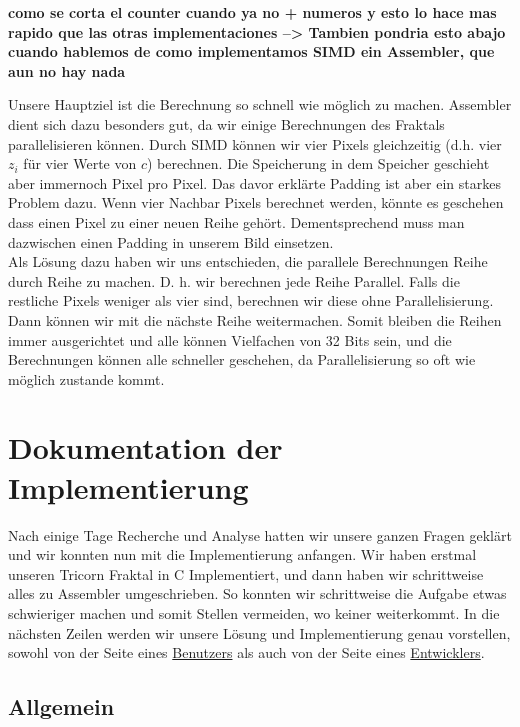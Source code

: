 \documentclass[course=erap]{aspdoc}
\begin{document}
\textbf{como se corta el counter cuando ya no + numeros y esto lo hace mas rapido que las otras implementaciones --> Tambien pondria esto abajo cuando hablemos de como implementamos SIMD ein Assembler, que aun no hay nada}

Unsere Hauptziel ist die Berechnung so schnell wie m\"oglich zu machen. Assembler dient sich dazu besonders gut, da wir einige Berechnungen des Fraktals parallelisieren k\"onnen. Durch SIMD k\"onnen wir vier Pixels gleichzeitig (d.h. vier $z_i$ f\"ur vier Werte von $c$) berechnen. Die Speicherung in dem Speicher geschieht aber immernoch Pixel pro Pixel. Das davor erkl\"arte Padding ist aber ein starkes Problem dazu. Wenn vier Nachbar Pixels berechnet werden, k\"onnte es geschehen dass einen Pixel zu einer neuen Reihe geh\"ort. Dementsprechend muss man dazwischen einen Padding in unserem Bild einsetzen. \\

Als L\"osung dazu haben wir uns entschieden, die parallele Berechnungen Reihe durch Reihe zu machen. D. h. wir berechnen jede Reihe Parallel. Falls die restliche Pixels weniger als vier sind, berechnen wir diese ohne Parallelisierung. Dann k\"onnen wir mit die n\"achste Reihe weitermachen. Somit bleiben die Reihen immer ausgerichtet und alle k\"onnen Vielfachen von 32 Bits sein, und die Berechnungen k\"onnen alle schneller geschehen, da Parallelisierung so oft wie m\"oglich zustande kommt. 

\section{Dokumentation der Implementierung}\label{section:dokumentation}

Nach einige Tage Recherche und Analyse hatten wir unsere ganzen Fragen gekl\"art und wir konnten nun mit die Implementierung anfangen. Wir haben erstmal unseren Tricorn Fraktal in C Implementiert, und dann haben wir schrittweise alles zu Assembler umgeschrieben. So konnten wir schrittweise die Aufgabe etwas schwieriger machen und somit Stellen vermeiden, wo keiner weiterkommt. In die n\"achsten Zeilen werden wir unsere L\"osung und Implementierung genau vorstellen, sowohl von der Seite eines \hyperref[sub:benutzer]{Benutzers} als auch von der Seite eines \hyperref[sub:entwickler]{Entwicklers}. 

\subsection{Allgemein}
\end{document}
